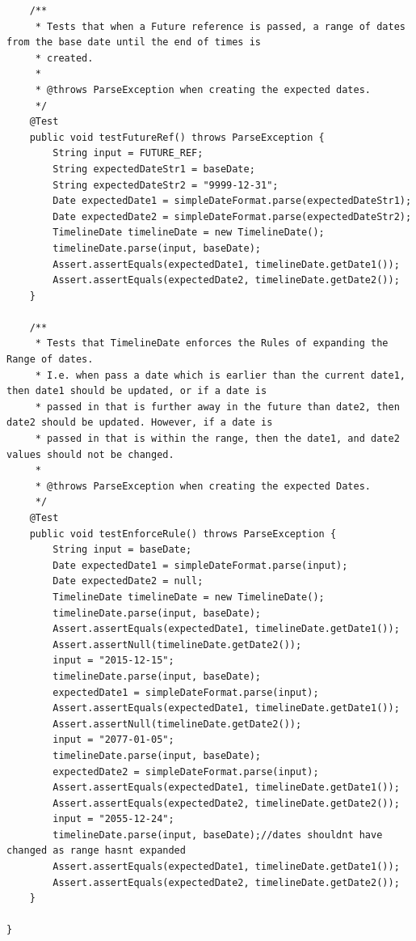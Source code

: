 \begin{lstlisting}
    /**
     * Tests that when a Future reference is passed, a range of dates from the base date until the end of times is
     * created.
     *
     * @throws ParseException when creating the expected dates.
     */
    @Test
    public void testFutureRef() throws ParseException {
        String input = FUTURE_REF;
        String expectedDateStr1 = baseDate;
        String expectedDateStr2 = "9999-12-31";
        Date expectedDate1 = simpleDateFormat.parse(expectedDateStr1);
        Date expectedDate2 = simpleDateFormat.parse(expectedDateStr2);
        TimelineDate timelineDate = new TimelineDate();
        timelineDate.parse(input, baseDate);
        Assert.assertEquals(expectedDate1, timelineDate.getDate1());
        Assert.assertEquals(expectedDate2, timelineDate.getDate2());
    }

    /**
     * Tests that TimelineDate enforces the Rules of expanding the Range of dates.
     * I.e. when pass a date which is earlier than the current date1, then date1 should be updated, or if a date is
     * passed in that is further away in the future than date2, then date2 should be updated. However, if a date is
     * passed in that is within the range, then the date1, and date2 values should not be changed.
     *
     * @throws ParseException when creating the expected Dates.
     */
    @Test
    public void testEnforceRule() throws ParseException {
        String input = baseDate;
        Date expectedDate1 = simpleDateFormat.parse(input);
        Date expectedDate2 = null;
        TimelineDate timelineDate = new TimelineDate();
        timelineDate.parse(input, baseDate);
        Assert.assertEquals(expectedDate1, timelineDate.getDate1());
        Assert.assertNull(timelineDate.getDate2());
        input = "2015-12-15";
        timelineDate.parse(input, baseDate);
        expectedDate1 = simpleDateFormat.parse(input);
        Assert.assertEquals(expectedDate1, timelineDate.getDate1());
        Assert.assertNull(timelineDate.getDate2());
        input = "2077-01-05";
        timelineDate.parse(input, baseDate);
        expectedDate2 = simpleDateFormat.parse(input);
        Assert.assertEquals(expectedDate1, timelineDate.getDate1());
        Assert.assertEquals(expectedDate2, timelineDate.getDate2());
        input = "2055-12-24";
        timelineDate.parse(input, baseDate);//dates shouldnt have changed as range hasnt expanded
        Assert.assertEquals(expectedDate1, timelineDate.getDate1());
        Assert.assertEquals(expectedDate2, timelineDate.getDate2());
    }

}
\end{lstlisting}

